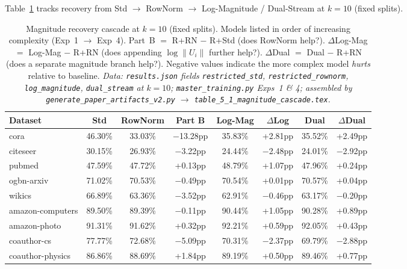 \documentclass[11pt]{article}
\begin{document}
Table~\ref{tab:magnitude_cascade} tracks recovery from Std $\to$ RowNorm $\to$
Log-Magnitude / Dual-Stream at $k{=}10$ (fixed splits).

\begin{table}[H]
\centering\small
\caption{Magnitude recovery cascade at $k{=}10$ (fixed splits).
Models listed in order of increasing complexity (Exp~1 $\to$ Exp~4).
Part~B $=$ R+RN $-$ R+Std (does RowNorm help?).
$\Delta$Log-Mag $=$ Log-Mag $-$ R+RN (does appending $\log\|U_i\|$ further help?).
$\Delta$Dual $=$ Dual $-$ R+RN (does a separate magnitude branch help?).
Negative values indicate the more complex model \emph{hurts} relative to baseline.
\textit{\scriptsize Data: \texttt{results.json} fields
\texttt{restricted\_std}, \texttt{restricted\_rownorm}, \texttt{log\_magnitude},
\texttt{dual\_stream} at $k{=}10$;
\texttt{master\_training.py} Exps~1 \& 4;
assembled by \texttt{generate\_paper\_artifacts\_v2.py} $\to$ \texttt{table\_5\_1\_magnitude\_cascade.tex}.}}
\label{tab:magnitude_cascade}
\begin{tabular}{lccccccc}
\toprule
Dataset & Std & RowNorm & Part B & Log-Mag & $\Delta$Log & Dual & $\Delta$Dual \\
\midrule
cora             & 46.30\% & 33.03\% & $-$13.28pp & 35.83\% & +2.81pp & 35.52\% & +2.49pp \\
citeseer         & 30.15\% & 26.93\% & $-$3.22pp  & 24.44\% & $-$2.48pp & 24.01\% & $-$2.92pp \\
pubmed           & 47.59\% & 47.72\% & +0.13pp    & 48.79\% & +1.07pp & 47.96\% & +0.24pp \\
ogbn-arxiv       & 71.02\% & 70.53\% & $-$0.49pp  & 70.54\% & +0.01pp & 70.57\% & +0.04pp \\
wikics           & 66.89\% & 63.36\% & $-$3.52pp  & 62.91\% & $-$0.46pp & 63.17\% & $-$0.20pp \\
amazon-computers & 89.50\% & 89.39\% & $-$0.11pp  & 90.44\% & +1.05pp & 90.28\% & +0.89pp \\
amazon-photo     & 91.31\% & 91.62\% & +0.32pp    & 92.21\% & +0.59pp & 92.05\% & +0.43pp \\
coauthor-cs      & 77.77\% & 72.68\% & $-$5.09pp  & 70.31\% & $-$2.37pp & 69.79\% & $-$2.88pp \\
coauthor-physics & 86.86\% & 88.69\% & +1.84pp    & 89.19\% & +0.50pp & 89.46\% & +0.77pp \\
\bottomrule
\end{tabular}
\end{table}
\end{document}
